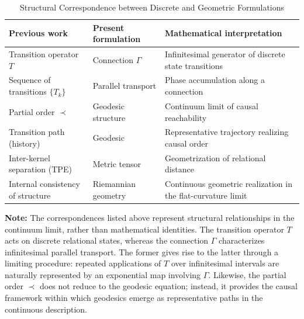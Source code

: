 \documentclass[%
 reprint,
 amsmath,amssymb,
 aps,
 prb,
]{revtex4-2}
\numberwithin{equation}{section}
\begin{document}
\begin{table}[t!]
\centering
\caption{Structural Correspondence between Discrete and Geometric Formulations}
\label{tab:correspondence_previous_current}
\renewcommand{\arraystretch}{1.4}
\begin{tabular}{p{5.0cm}p{5.5cm}p{5.5cm}}
\toprule
\textbf{Previous work} & \textbf{Present formulation\cite{hanamura17765336}} & \textbf{Mathematical interpretation} \\
\midrule
Transition operator $T$ & Connection $\Gamma$ & Infinitesimal generator of discrete state transitions \\
\addlinespace[0.3cm]
Sequence of transitions $\{T_k\}$ & Parallel transport & Phase accumulation along a connection \\
\addlinespace[0.3cm]
Partial order $\prec$ & Geodesic structure & Continuum limit of causal reachability \\
\addlinespace[0.3cm]
Transition path (history) & Geodesic & Representative trajectory realizing causal order \\
\addlinespace[0.3cm]
Inter-kernel separation (TPE) & Metric tensor & Geometrization of relational distance \\
\addlinespace[0.3cm]
Internal consistency of structure & Riemannian geometry & Continuous geometric realization in the flat-curvature limit \\
\bottomrule
\end{tabular}
\vspace{0.2cm}
\begin{flushleft}
\footnotesize
\textbf{Note:} The correspondences listed above represent structural relationships in the continuum limit, rather than mathematical identities. 
The transition operator $T$ acts on discrete relational states, whereas the connection $\Gamma$ characterizes infinitesimal parallel transport. 
The former gives rise to the latter through a limiting procedure: repeated applications of $T$ over infinitesimal intervals are naturally represented by an exponential map involving $\Gamma$. 
Likewise, the partial order $\prec$ does not reduce to the geodesic equation; instead, it provides the causal framework within which geodesics emerge as representative paths in the continuous description.
\end{flushleft}
\end{table}

\end{document}
